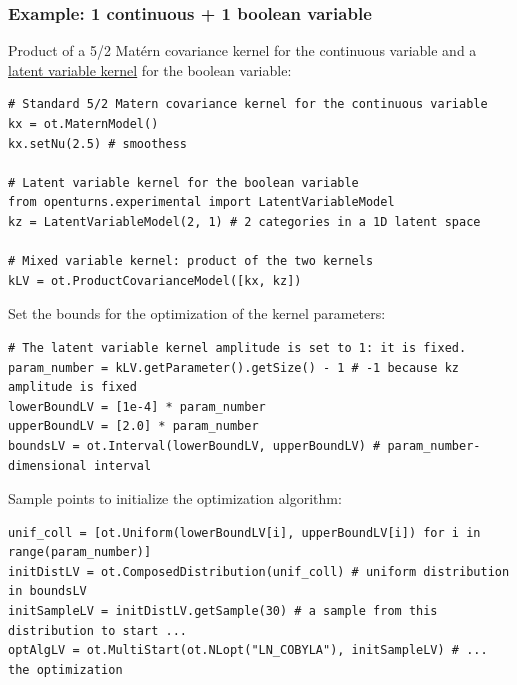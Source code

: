 \documentclass{beamer}
\begin{document}

\begin{frame}[containsverbatim]
\frametitle{Example: 1 continuous + 1 boolean variable}
\small
Product of a 5/2 Mat\'ern covariance kernel for the continuous variable and a \href{http://openturns.github.io/openturns/1.22/auto_meta_modeling/kriging_metamodel/plot_kriging_categorical.html#sphx-glr-auto-meta-modeling-kriging-metamodel-plot-kriging-categorical-py}{latent variable kernel} for the boolean variable:

\begin{lstlisting}
# Standard 5/2 Matern covariance kernel for the continuous variable
kx = ot.MaternModel()
kx.setNu(2.5) # smoothess

# Latent variable kernel for the boolean variable
from openturns.experimental import LatentVariableModel
kz = LatentVariableModel(2, 1) # 2 categories in a 1D latent space

# Mixed variable kernel: product of the two kernels
kLV = ot.ProductCovarianceModel([kx, kz])
\end{lstlisting}

Set the bounds for the optimization of the kernel parameters:

\begin{lstlisting}
# The latent variable kernel amplitude is set to 1: it is fixed.
param_number = kLV.getParameter().getSize() - 1 # -1 because kz amplitude is fixed
lowerBoundLV = [1e-4] * param_number
upperBoundLV = [2.0] * param_number
boundsLV = ot.Interval(lowerBoundLV, upperBoundLV) # param_number-dimensional interval
\end{lstlisting}

Sample points to initialize the optimization algorithm:
\begin{lstlisting}
unif_coll = [ot.Uniform(lowerBoundLV[i], upperBoundLV[i]) for i in range(param_number)]
initDistLV = ot.ComposedDistribution(unif_coll) # uniform distribution in boundsLV
initSampleLV = initDistLV.getSample(30) # a sample from this distribution to start ...
optAlgLV = ot.MultiStart(ot.NLopt("LN_COBYLA"), initSampleLV) # ... the optimization
\end{lstlisting}

\end{frame}

\end{document}
